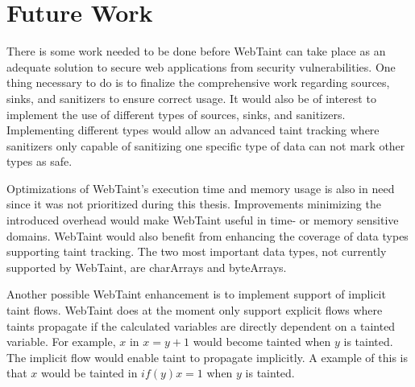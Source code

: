 \chapter{Future Work}
\label{FutureWork}
There is some work needed to be done before WebTaint can take place as an adequate solution to secure web applications from security vulnerabilities. One thing necessary to do is to finalize the comprehensive work regarding sources, sinks, and sanitizers to ensure correct usage. It would also be of interest to implement the use of different types of sources, sinks, and sanitizers. Implementing different types would allow an advanced taint tracking where sanitizers only capable of sanitizing one specific type of data can not mark other types as safe. 

Optimizations of WebTaint's execution time and memory usage is also in need since it was not prioritized during this thesis. Improvements minimizing the introduced overhead would make WebTaint useful in time- or memory sensitive domains. WebTaint would also benefit from enhancing the coverage of data types supporting taint tracking. The two most important data types, not currently supported by WebTaint, are charArrays and byteArrays. 

Another possible WebTaint enhancement is to implement support of implicit taint flows. WebTaint does at the moment only support explicit flows where taints propagate if the calculated variables are directly dependent on a tainted variable. For example, $ x $ in $ x = y + 1 $ would become tainted when $ y $ is tainted. The implicit flow would enable taint to propagate implicitly. A example of this is that $ x $ would be tainted in $ if (y) x = 1 $ when $ y $ is tainted.